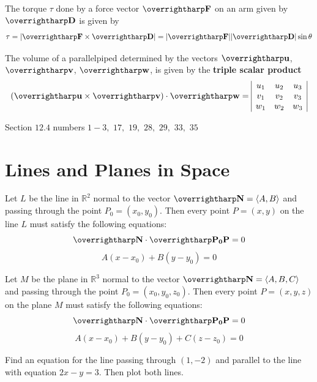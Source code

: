\documentclass[letterpaper, twoside, 12pt]{book}
\begin{document}
\begin{definition}
  The torque $\tau$ done by a force vector $\harpvec{F}$ on an arm given by
  $\harpvec{D}$ is given by
  \[
    \tau = |\harpvec{F} \times \harpvec{D}|
      =
    |\harpvec{F}||\harpvec{D}|\sin \theta
  \]
\end{definition}

\begin{theorem}
  The volume of a parallelpiped determined by the vectors
  $\harpvec{u}$, $\harpvec{v}$, $\harpvec{w}$, is given by
  the \textbf{triple scalar product}
    \[
      (\harpvec{u}\times\harpvec{v})\cdot\harpvec{w} =
      \begin{array}{|c c c|}
      u_1 & u_2 & u_3 \\
      v_1 & v_2 & v_3 \\
      w_1 & w_2 & w_3 \\
      \end{array}
    \]
\end{theorem}

\begin{suggestedHW}
  Section $12.4$ numbers $1 - 3,$ $17,$ $19,$ $28,$ $29,$ $33,$ $35$
\end{suggestedHW}



\section{Lines and Planes in Space}

\begin{theorem}
  Let $L$ be the line in $\mathbb R^2$ normal to the vector $\harpvec N=\<A,B\>$
  and passing through the point $P_0=(x_0,y_0)$. Then every point $P=(x,y)$
  on the line $L$ must satisfy the following equations:
  \[
    \harpvec N \cdot \harpvec{P_0P} = 0
  \]
  \[
    A(x-x_0) + B(y-y_0) = 0
  \]

  Let $M$ be the plane in $\mathbb R^3$ normal to the vector $\harpvec N=\<A,B,C\>$
  and passing through the point $P_0=(x_0,y_0,z_0)$. Then every point $P=(x,y,z)$
  on the plane $M$ must satisfy the following equations:
  \[
    \harpvec N \cdot \harpvec{P_0P} = 0
  \]
  \[
    A(x-x_0) + B(y-y_0) + C(z-z_0) = 0
  \]
\end{theorem}

          \begin{problem}
            Find an equation for the line passing through $(1,-2)$ and parallel
            to the line with equation $2x-y=3$. Then plot both lines.
          \end{problem}
\end{document}
